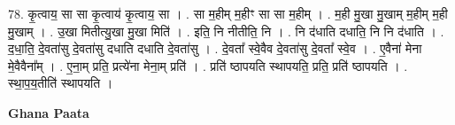 \documentclass[17pt]{extarticle}
\begin{document}
78. कृ॒त्वाय॒ सा सा कृ॒त्वाय॑ कृ॒त्वाय॒ सा । . सा म॒हीम् म॒हीꣳ सा सा म॒हीम् । . म॒ही मु॒खा मु॒खाम् म॒हीम् म॒ही मु॒खाम् । . उ॒खा मितीत्यु॒खा मु॒खा मिति॑ । . इति॒ नि नीतीति॒ नि । . नि द॑धाति दधाति॒ नि नि द॑धाति । . द॒धा॒ति॒ दे॒वता॑सु दे॒वता॑सु दधाति दधाति दे॒वता॑सु । . दे॒वता᳚ स्वे॒वैव दे॒वता॑सु दे॒वता᳚ स्वे॒व । . ए॒वैना॑ मेना मे॒वैवैना᳚म् । . ए॒ना॒म् प्रति॒ प्रत्ये॑ना मेना॒म् प्रति॑ । . प्रति॑ ष्ठापयति स्थापयति॒ प्रति॒ प्रति॑ ष्ठापयति । . स्था॒प॒य॒तीति॑ स्थापयति । \newline

\textbf{Ghana Paata } \newline
\end{document}
